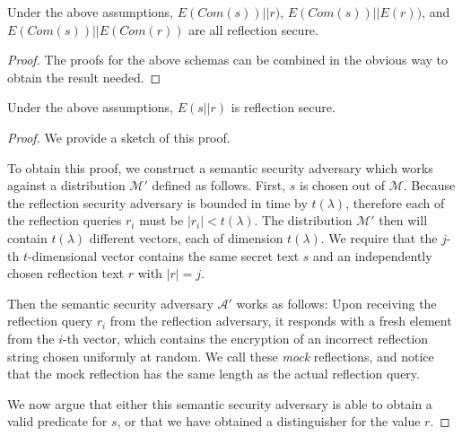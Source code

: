 \begin{lemma}
    Under the above assumptions, $E(Com(s)) || r)$, $E(Com(s)) || E(r))$, and
    $E(Com(s)) || E(Com(r))$ are all reflection secure.
\end{lemma}

\begin{proof}
    The proofs for the above schemas can be combined in the obvious way to
    obtain the result needed.
\end{proof}

\begin{lemma}
    Under the above assumptions, $E(s || r)$ is reflection secure.
\end{lemma}

\begin{proof}
    We provide a sketch of this proof.

    To obtain this proof, we construct a semantic security adversary which
    works against a distribution $\mathcal{M'}$ defined as follows. First, $s$
    is chosen out of $\mathcal{M}$. Because the reflection security adversary
    is bounded in time by $t(\lambda)$, therefore each of the reflection
    queries $r_i$ must be $|r_i| < t(\lambda)$. The distribution $\mathcal{M'}$
    then will contain $t(\lambda)$ different vectors, each of dimension
    $t(\lambda)$. We require that the $j$-th $t$-dimensional vector contains
    the same secret text $s$ and an independently chosen reflection text $r$
    with $|r| = j$.

    Then the semantic security adversary $\mathcal{A'}$ works as follows: Upon
    receiving the reflection query $r_i$ from the reflection adversary, it
    responds with a fresh element from the $i$-th vector, which contains the
    encryption of an incorrect reflection string chosen uniformly at random. We
    call these \textit{mock} reflections, and notice that the mock reflection
    has the same length as the actual reflection query.

    We now argue that either this semantic security adversary is able to obtain
    a valid predicate for $s$, or that we have obtained a distinguisher for the
    value $r$.


\end{proof}
